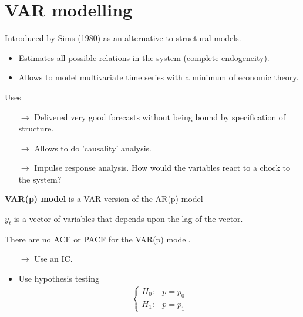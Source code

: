 \section{VAR modelling}
\begin{multicols}{2}\noindent
Introduced by Sims (1980) as an alternative to structural models.
\begin{itemize}
  \item Estimates all possible relations in the system (complete endogeneity).
  \item Allows to model multivariate time series with a minimum of economic theory.
\end{itemize}
Uses
\begin{itemize}
  \item[$\rightarrow$] Delivered very good forecasts without being bound by specification of structure.
  \item[$\rightarrow$] Allows to do 'causality' analysis.
  \item[$\rightarrow$] Impulse response analysis. How would the variables react to a chock to the system?
\end{itemize}
\textbf{VAR(p) model} is a VAR version of the AR(p) model\par
$y_t$ is a vector of variables that depends upon the lag of the vector.\par
There are no ACF or PACF for the VAR(p) model.
\begin{itemize}
  \item[$\rightarrow$] Use an IC.
  \item Use hypothesis testing
  \begin{align*}
   \left\{ \begin{array}{cc}
    H_0: & p=p_0 \\
    H_1: & p=p_1
   \end{array} \right.
  \end{align*}
\end{itemize}



\end{multicols}

